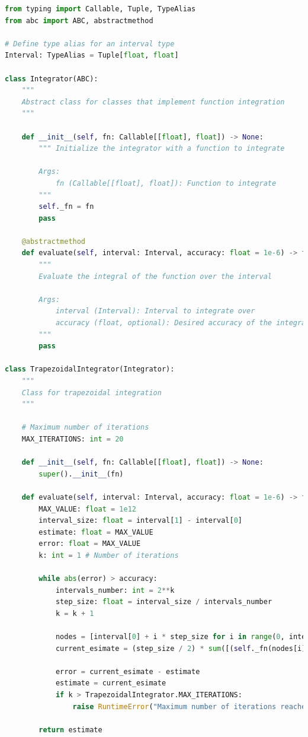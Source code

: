 \documentclass[12pt]{extarticle}
\begin{document}
\begin{lstlisting}[language=Python, caption=Реалізація складової квадратурної формули трапеції]
from typing import Callable, Tuple, TypeAlias
from abc import ABC, abstractmethod

# Define type alias for an interval type
Interval: TypeAlias = Tuple[float, float]

class Integrator(ABC):
    """
    Abstract class for classes that implement function integration
    """
    
    def __init__(self, fn: Callable[[float], float]) -> None:
        """ Initialize the integrator with a function to integrate

        Args:
            fn (Callable[[float], float]): Function to integrate
        """
        self._fn = fn
        pass
    
    @abstractmethod
    def evaluate(self, interval: Interval, accuracy: float = 1e-6) -> float:
        """
        Evaluate the integral of the function over the interval
        
        Args:
            interval (Interval): Interval to integrate over
            accuracy (float, optional): Desired accuracy of the integral. Defaults to `1e-6`.
        """
        pass
    
class TrapezoidalIntegrator(Integrator):
    """
    Class for trapezoidal integration
    """
    
    # Maximum number of iterations
    MAX_ITERATIONS: int = 20
    
    def __init__(self, fn: Callable[[float], float]) -> None:
        super().__init__(fn)
    
    def evaluate(self, interval: Interval, accuracy: float = 1e-6) -> float:
        MAX_VALUE: float = 1e12
        interval_size: float = interval[1] - interval[0]
        estimate: float = MAX_VALUE 
        error: float = MAX_VALUE
        k: int = 1 # Number of iterations
        
        while abs(error) > accuracy:
            intervals_number: int = 2**k
            step_size: float = interval_size / intervals_number
            k = k + 1
            
            nodes = [interval[0] + i * step_size for i in range(0, intervals_number+1)]
            current_esimate = (step_size / 2) * sum([(self._fn(nodes[i]) + self._fn(nodes[i+1])) for i in range(0, intervals_number)])
            
            error = current_esimate - estimate
            estimate = current_esimate
            if k > TrapezoidalIntegrator.MAX_ITERATIONS:
                raise RuntimeError("Maximum number of iterations reached")
            
        return estimate
\end{lstlisting}
\end{document}
